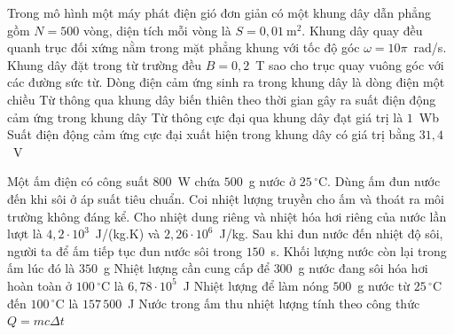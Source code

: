 	\begin{ex}%
		Trong mô hình một máy phát điện gió đơn giản có một khung dây dẫn phẳng gồm $N=500$ vòng, diện tích mỗi vòng là $S=0{,}01~\text{m}^2$. Khung dây quay đều quanh trục đối xứng nằm trong mặt phẳng khung với tốc độ góc $\omega=10\pi$~rad/s. Khung dây đặt trong từ trường đều $B=0{,}2$~T sao cho trục quay vuông góc với các đường sức từ.
		\choiceTFt
		{Dòng điện cảm ứng sinh ra trong khung dây là dòng điện một chiều}
		{\True Từ thông qua khung dây biến thiên theo thời gian gây ra suất điện động cảm ứng trong khung dây}
		{\True Từ thông cực đại qua khung dây đạt giá trị là $1$~Wb}
		{\True Suất điện động cảm ứng cực đại xuất hiện trong khung dây có giá trị bằng $31{,}4$~V}
	\end{ex}

	\begin{ex}%
		Một ấm điện có công suất $800$~W chứa $500$~g nước ở $25\,^\circ\text{C}$. Dùng ấm đun nước đến khi sôi ở áp suất tiêu chuẩn. Coi nhiệt lượng truyền cho ấm và thoát ra môi trường không đáng kể. Cho nhiệt dung riêng và nhiệt hóa hơi riêng của nước lần lượt là $4{,}2\cdot 10^3$~J/(kg.K) và $2{,}26\cdot 10^6$~J/kg.
		\choiceTFt
		{Sau khi đun nước đến nhiệt độ sôi, người ta để ấm tiếp tục đun nước sôi trong $150$~s. Khối lượng nước còn lại trong ấm lúc đó là $350$~g}
		{\True Nhiệt lượng cần cung cấp để $300$~g nước đang sôi hóa hơi hoàn toàn ở $100\,^\circ\text{C}$ là $6{,}78\cdot 10^5$~J}
		{\True Nhiệt lượng để làm nóng $500$~g nước từ $25\,^\circ\text{C}$ đến $100\,^\circ\text{C}$ là $157\,500$~J}
		{\True Nước trong ấm thu nhiệt lượng tính theo công thức $Q=mc\Delta t$}
	\end{ex}

